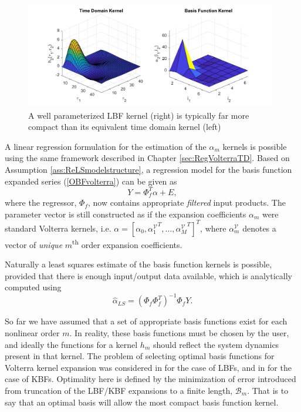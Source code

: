 \begin{figure}[h]
\centering
\includegraphics[width = 0.98\textwidth]{Chapter5_RegBFs/TDvsBFkernels3.pdf}
\caption{A well parameterized LBF kernel (right) is typically far more compact than its equivalent time domain kernel (left)}
\label{fig:CompactBFkernel}
\end{figure}

A linear regression formulation for the estimation of the $\alpha_m$ kernels is possible using the same framework described in Chapter \ref{sec:RegVolterraTD}. Based on Assumption \ref{ass:ReLSmodelstructure}, a regression model for the basis function expanded series (\ref{OBFvolterra}) can be given as
\begin{equation}
Y = \Phi_f^T \alpha + E,
\label{eq:RegressionStructure_OBFseries}
\end{equation}
where the regressor, $\Phi_{f}$, now contains appropriate \emph{filtered} input products. The parameter vector is still constructed as if the expansion coefficients $\alpha_m$ were standard Volterra kernels, i.e. $\alpha = [\alpha_0, {\alpha^{\mathcal{V}}_1}^T, \hdots , {\alpha^{\mathcal{V}}_M}^T]^T$, where $\alpha^{\mathcal{V}}_m$ denotes a vector of \emph{unique} $m$\textsuperscript{th} order expansion coefficients.

Naturally a least squares estimate of the basis function kernels is possible, provided that there is enough input/output data available, which is analytically computed using
\begin{equation}
\hat{\alpha}_{LS} = ( \Phi_{f}  \Phi_{f}^T)^{-1} \Phi_{f} Y.
\label{LSbf}
\end{equation}

So far we have assumed that a set of appropriate basis functions exist for each nonlinear order $m$. In reality, these basis functions must be chosen by the user, and ideally the functions for a kernel $h_m$ should reflect the system dynamics present in that kernel. The problem of selecting optimal basis functions for Volterra kernel expansion was considered in \cite{Campello2004} for the case of LBFs, and in \cite{Rosa2007} for the case of KBFs. Optimality here is defined by the minimization of error introduced from truncation of the LBF/KBF expansions to a finite length, $\mathcal{B}_m$. That is to say that an optimal basis will allow the most compact basis function kernel. 

